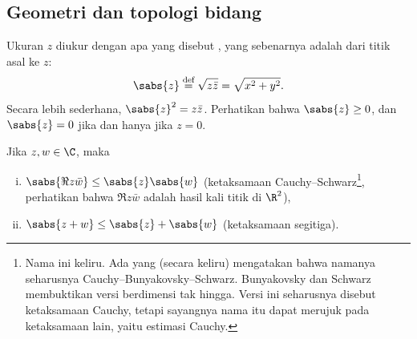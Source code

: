 
\subsection{Geometri dan topologi bidang}

Ukuran $z$ diukur dengan apa yang disebut \emph{},
yang sebenarnya adalah \emph{}
dari titik asal ke $z$:
%
\begin{equation*}
\sabs{z} \overset{\text{def}}{=} \sqrt{z \bar{z}} = \sqrt{x^2+y^2} .
\end{equation*}
Secara lebih sederhana, ${\sabs{z}}^2 = z\bar{z}$.
Perhatikan bahwa $\sabs{z} \geq 0$, dan $\sabs{z} = 0$
jika dan hanya jika $z=0$.

\begin{prop}
Jika $z,w \in \C$, maka
\begin{enumerate}[(i)]
\item
$\sabs{\Re z\bar{w}} \leq \sabs{z} \sabs{w}$ \quad (ketaksamaan
Cauchy--Schwarz\footnote{%
Nama ini keliru.
Ada yang (secara keliru) mengatakan bahwa namanya seharusnya
Cauchy--Bunyakovsky--Schwarz.
Bunyakovsky dan Schwarz membuktikan versi berdimensi tak hingga.
Versi ini seharusnya disebut ketaksamaan Cauchy, tetapi sayangnya nama itu
dapat merujuk pada ketaksamaan lain, yaitu estimasi Cauchy.}, perhatikan bahwa
$\Re z
\bar{w}$ adalah hasil kali titik di $\R^2$),
\item
$\sabs{z+w} \leq \sabs{z} + \sabs{w}$ \quad (ketaksamaan segitiga).%
\end{enumerate}
\end{prop}
